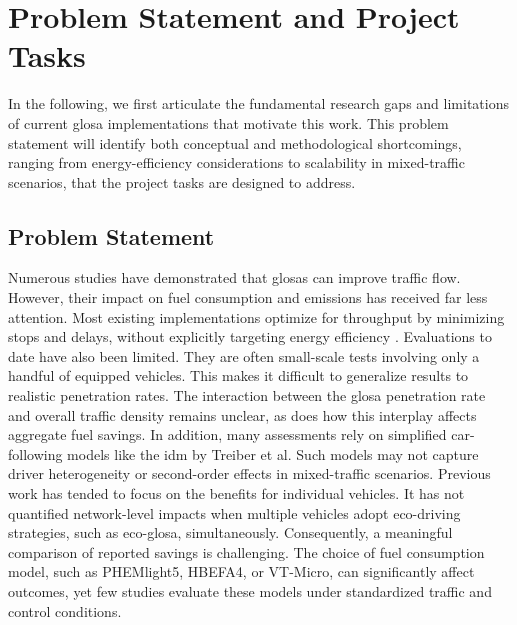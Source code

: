 \section{Problem Statement and Project Tasks}
\label{sec:Problem_Statement_and_Project_Tasks}
In the following, we first articulate the fundamental research gaps and limitations of current \ac{glosa} implementations that motivate this work. This problem statement will identify both conceptual and methodological shortcomings, ranging from energy-efficiency considerations to scalability in mixed-traffic scenarios, that the project tasks are designed to address.

\subsection{Problem Statement}
\label{subsec:Problem_Statement}
Numerous studies have demonstrated that \acp{glosa} can improve traffic flow. However, their impact on fuel consumption and emissions has received far less attention. Most existing implementations optimize for throughput by minimizing stops and delays, without explicitly targeting energy efficiency \cite{COPPOLA2022103455}. Evaluations to date have also been limited. They are often small-scale tests involving only a handful of equipped vehicles. This makes it difficult to generalize results to realistic penetration rates. The interaction between the \ac{glosa} penetration rate and overall traffic density remains unclear, as does how this interplay affects aggregate fuel savings. In addition, many assessments rely on simplified car-following models like the \ac{idm} by Treiber et al. \cite{Treiber_2000} Such models may not capture driver heterogeneity or second-order effects in mixed-traffic scenarios. Previous work has tended to focus on the benefits for individual vehicles. It has not quantified network-level impacts when multiple vehicles adopt eco-driving strategies, such as \ac{eco-glosa}, simultaneously. Consequently, a meaningful comparison of reported savings is challenging. The choice of fuel consumption model, such as PHEMlight5, HBEFA4, or VT-Micro, can significantly affect outcomes, yet few studies evaluate these models under standardized traffic and control conditions.

